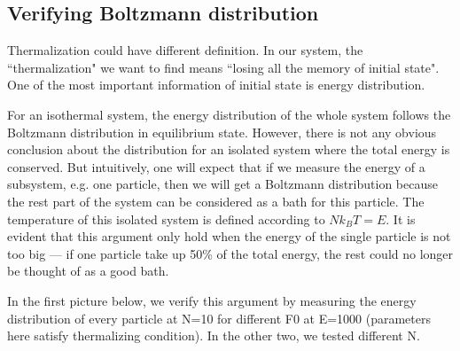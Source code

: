 \documentclass[aps,preprintnumbers,onecolumn,amsmath,amssymb,floatfix,pra]{revtex4-1}
\begin{document}
\subsection{Verifying Boltzmann distribution}
Thermalization could have different definition. In our system, the ``thermalization" we want to find means ``losing all the memory of initial state". One of the most important information of initial state is energy distribution. 
 
For an isothermal system, the energy distribution of the whole system follows the Boltzmann distribution in equilibrium state. However, there is not any obvious conclusion about the distribution for an isolated system where the total energy is conserved. But intuitively, one will expect that if we measure the energy of a subsystem, e.g. one particle, then we will get a Boltzmann distribution because the rest part of the system can be considered as a bath for this particle. The temperature of this isolated system is defined according to $Nk_BT=E$. It is evident that this argument only hold when the energy of the single particle is not too big --- if one particle take up 50\% of the total energy, the rest could no longer be thought of as a good bath.

In the first picture below, we verify this argument by measuring the energy distribution of every particle at N=10 for different F0 at E=1000 (parameters here satisfy thermalizing condition). In the other two, we tested different N.




\end{document}

